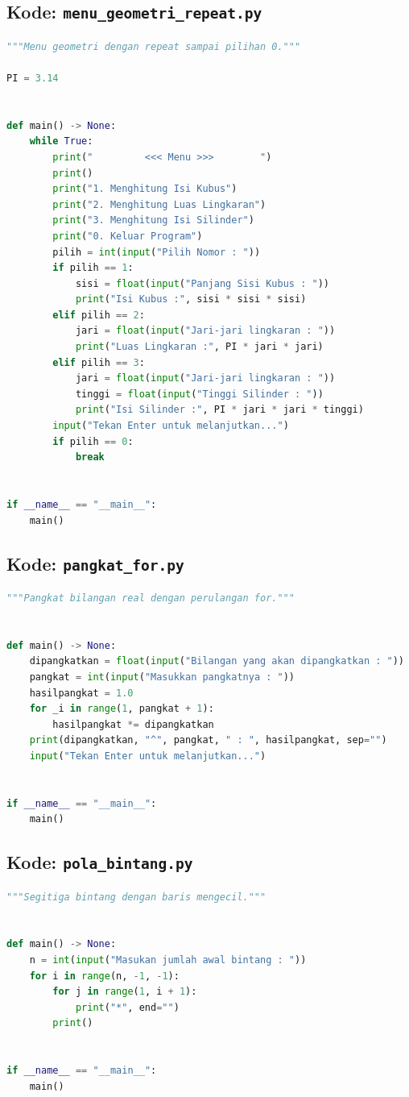 ﻿\documentclass[../main.tex]{subfiles}
\begin{document}
\subsection{Kode: \texttt{menu\_geometri\_repeat.py}}
\introstudikasuskode
\begin{lstlisting}[language=Python,caption={\texttt{menu\_geometri\_repeat.py}}]
"""Menu geometri dengan repeat sampai pilihan 0."""

PI = 3.14


def main() -> None:
    while True:
        print("         <<< Menu >>>        ")
        print()
        print("1. Menghitung Isi Kubus")
        print("2. Menghitung Luas Lingkaran")
        print("3. Menghitung Isi Silinder")
        print("0. Keluar Program")
        pilih = int(input("Pilih Nomor : "))
        if pilih == 1:
            sisi = float(input("Panjang Sisi Kubus : "))
            print("Isi Kubus :", sisi * sisi * sisi)
        elif pilih == 2:
            jari = float(input("Jari-jari lingkaran : "))
            print("Luas Lingkaran :", PI * jari * jari)
        elif pilih == 3:
            jari = float(input("Jari-jari lingkaran : "))
            tinggi = float(input("Tinggi Silinder : "))
            print("Isi Silinder :", PI * jari * jari * tinggi)
        input("Tekan Enter untuk melanjutkan...")
        if pilih == 0:
            break


if __name__ == "__main__":
    main()
\end{lstlisting}

\subsection{Kode: \texttt{pangkat\_for.py}}
\introstudikasuskode
\begin{lstlisting}[language=Python,caption={\texttt{pangkat\_for.py}}]
"""Pangkat bilangan real dengan perulangan for."""


def main() -> None:
    dipangkatkan = float(input("Bilangan yang akan dipangkatkan : "))
    pangkat = int(input("Masukkan pangkatnya : "))
    hasilpangkat = 1.0
    for _i in range(1, pangkat + 1):
        hasilpangkat *= dipangkatkan
    print(dipangkatkan, "^", pangkat, " : ", hasilpangkat, sep="")
    input("Tekan Enter untuk melanjutkan...")


if __name__ == "__main__":
    main()
\end{lstlisting}

\subsection{Kode: \texttt{pola\_bintang.py}}
\introstudikasuskode
\begin{lstlisting}[language=Python,caption={\texttt{pola\_bintang.py}}]
"""Segitiga bintang dengan baris mengecil."""


def main() -> None:
    n = int(input("Masukan jumlah awal bintang : "))
    for i in range(n, -1, -1):
        for j in range(1, i + 1):
            print("*", end="")
        print()


if __name__ == "__main__":
    main()
\end{lstlisting}
\end{document}
